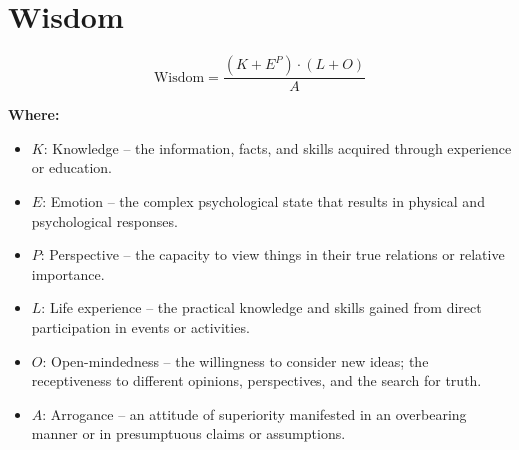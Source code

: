 \chapter{Wisdom}

\begin{equation}
\text{Wisdom} = \frac{(K + E^P) \cdot (L + O)}{A}
\end{equation}

\textbf{Where:}

\begin{itemize}
    \item $K$: Knowledge -- the information, facts, and skills acquired through experience or education.
    \item $E$: Emotion -- the complex psychological state that results in physical and psychological responses.
    \item $P$: Perspective -- the capacity to view things in their true relations or relative importance.
    \item $L$: Life experience -- the practical knowledge and skills gained from direct participation in events or activities.
    \item $O$: Open-mindedness -- the willingness to consider new ideas; the receptiveness to different opinions, perspectives, and the search for truth.
    \item $A$: Arrogance -- an attitude of superiority manifested in an overbearing manner or in presumptuous claims or assumptions.
\end{itemize}